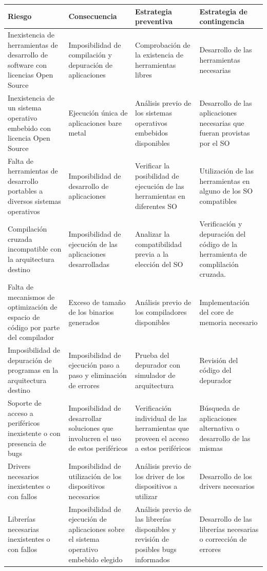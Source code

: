 		\newpage
		\begin{table}[!h]
		\centering
		\begin{tabular}{ p{4cm} p{4cm} p{4cm} p{3cm} }
		\hline 
		\rowcolor[gray]{0.8} Riesgo & Consecuencia & Estrategia preventiva & Estrategia de contingencia\\
		\hline
		Inexistencia de herramientas de desarrollo de software con licencias Open Source & Imposibilidad de compilación y depuración de aplicaciones &Comprobación de la existencia de herramientas libres & Desarrollo de las herramientas necesarias\\
		\hline
		Inexistencia de un sistema operativo embebido con licencia Open Source  & Ejecución única de aplicaciones bare metal  & Análisis previo de los sistemas operativos embebidos disponibles & Desarrollo de las aplicaciones necesarias que fueran provistas por el SO\\
		\hline		
		 Falta de herramientas de desarrollo portables a diversos sistemas operativos & Imposibilidad de desarrollo de aplicaciones& Verificar la posibilidad de ejecución de las herramientas en diferentes SO& Utilización de las herramientas en alguno de los SO compatibles\\
		\hline		
		 Compilación cruzada incompatible con la arquitectura destino& Imposibilidad de ejecución de las aplicaciones desarrolladas & Analizar la compatibilidad previa a la elección del SO &  Verificación y depuración del código de la herramienta de complilación cruzada. \\
		\hline
		Falta de mecanismos de optimización de espacio de código por parte del  compilador&Exceso de tamaño de los binarios generados & Análisis previo de los compiladores disponibles & Implementación del core de memoria necesario\\
		\hline
		Imposibilidad de depuración de programas en la arquitectura destino& Imposibilidad de ejecución paso a paso y eliminación de errores &Prueba del depurador con simulador de arquitectura & Revisión del código del depurador \\
		\hline
		Soporte de acceso a periféricos inexistente o con presencia de bugs & Imposibilidad de desarrollar soluciones que involucren el uso de estos periféricos & Verificación individual de las herramientas que proveen el acceso a estos periféricos & Búsqueda  de  aplicaciones alternativa o desarrollo de las mismas\\
		\hline
		 Drivers necesarios inexistentes o con fallos & Imposibilidad de utilización de los dispositivos necesarios&Análisis previo de los driver de los dispositivos a utilizar &  Desarrollo de los drivers necesarios\\
		\hline
		Librerías necesarias inexistentes o con fallos& Imposibilidad de ejecución de aplicaciones sobre el sistema operativo embebido elegido & Análisis previo de las librerías disponibles y revisión de posibles bugs informados &  Desarrollo de las librerías necesarias o corrección de errores\\
		\hline
		\end{tabular}
		\end{table}
